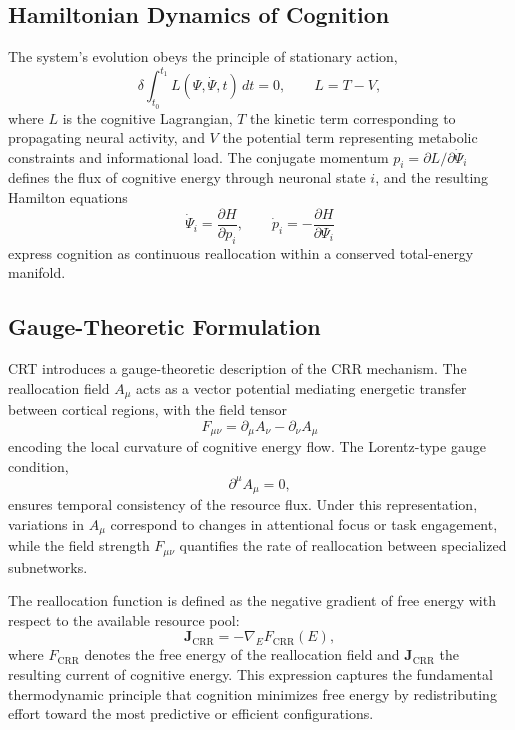 \documentclass[12pt,a4paper]{article}
\begin{document}
\subsection{Hamiltonian Dynamics of Cognition}

The system’s evolution obeys the principle of stationary action,
\[
\delta\!\int_{t_0}^{t_1}\! L(\Psi,\dot{\Psi},t)\,dt = 0,
\qquad L=T-V,
\]
where \(L\) is the cognitive Lagrangian, \(T\) the kinetic term corresponding to propagating neural activity, and \(V\) the potential term representing metabolic constraints and informational load.  The conjugate momentum \(p_i=\partial L/\partial \dot{\Psi}_i\) defines the flux of cognitive energy through neuronal state \(i\), and the resulting Hamilton equations
\[
\dot{\Psi}_i=\frac{\partial H}{\partial p_i},
\qquad
\dot{p}_i=-\frac{\partial H}{\partial \Psi_i}
\]
express cognition as continuous reallocation within a conserved total-energy manifold.

\subsection{Gauge-Theoretic Formulation}

CRT introduces a gauge-theoretic description of the CRR mechanism.  The reallocation field \(A_\mu\) acts as a vector potential mediating energetic transfer between cortical regions, with the field tensor
\begin{equation}
F_{\mu\nu}=\partial_\mu A_\nu-\partial_\nu A_\mu
\end{equation}
encoding the local curvature of cognitive energy flow.  The Lorentz-type gauge condition,
\[
\partial^\mu A_\mu = 0,
\]
ensures temporal consistency of the resource flux.  Under this representation, variations in \(A_\mu\) correspond to changes in attentional focus or task engagement, while the field strength \(F_{\mu\nu}\) quantifies the rate of reallocation between specialized subnetworks.

The reallocation function is defined as the negative gradient of free energy with respect to the available resource pool:
\begin{equation}
\mathbf{J}_{\mathrm{CRR}}
=-\nabla_{\!E} F_{\mathrm{CRR}}(E),
\end{equation}
where \(F_{\mathrm{CRR}}\) denotes the free energy of the reallocation field and \(\mathbf{J}_{\mathrm{CRR}}\) the resulting current of cognitive energy.  This expression captures the fundamental thermodynamic principle that cognition minimizes free energy by redistributing effort toward the most predictive or efficient configurations.
\end{document}

